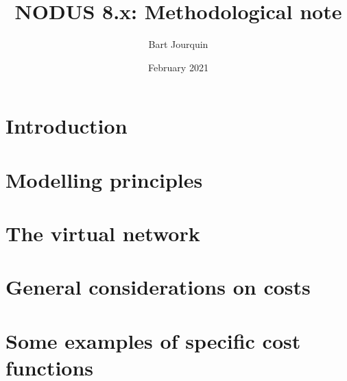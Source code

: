 \documentclass[english, a4paper]{report}
\title{NODUS 8.x: Methodological note}
\author{Bart Jourquin}
\date{February 2021}
\begin{document}
\maketitle

\pagestyle{fancyplain}


\setfooter{\thepage}{}{}{}{}{\thepage}%

\tableofcontents


%
\setfooter{\thepage}{}{}{}{}{\thepage}%

\chapter{Introduction}


\chapter{Modelling principles}


\chapter{The virtual network}


\chapter{General considerations on costs}


\chapter{Some examples of specific cost functions}

\end{document}
